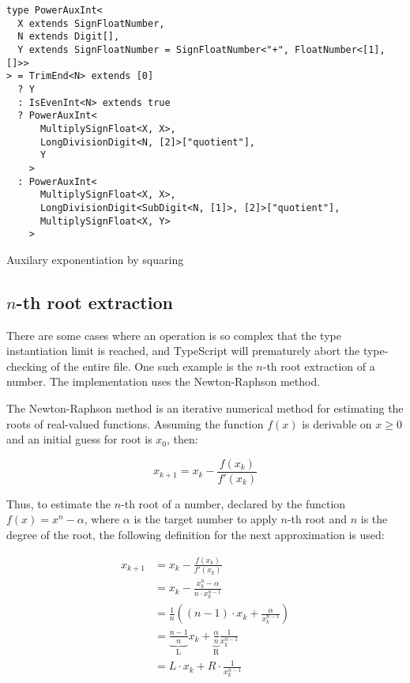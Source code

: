 \begin{listing}[ht]
  \begin{verbatim}
type PowerAuxInt<
  X extends SignFloatNumber,
  N extends Digit[],
  Y extends SignFloatNumber = SignFloatNumber<"+", FloatNumber<[1], []>>
> = TrimEnd<N> extends [0]
  ? Y
  : IsEvenInt<N> extends true
  ? PowerAuxInt<
      MultiplySignFloat<X, X>,
      LongDivisionDigit<N, [2]>["quotient"],
      Y
    >
  : PowerAuxInt<
      MultiplySignFloat<X, X>,
      LongDivisionDigit<SubDigit<N, [1]>, [2]>["quotient"],
      MultiplySignFloat<X, Y>
    >
\end{verbatim}
  \caption{Auxilary exponentiation by squaring}\label{lst:exponentiation-by-squaring-ts}
\end{listing}

\subsection{$n$-th root extraction}

There are some cases where an operation is so complex that the type instantiation limit is reached, and TypeScript will prematurely abort the type-checking of the entire file. One such example is the $n$-th root extraction of a number. The implementation uses the Newton-Raphson method.

The Newton-Raphson method \cite{gerlachAcceleratedConvergenceNewton1994} is an iterative numerical method for estimating the roots of real-valued functions. Assuming the function $f(x)$ is derivable on $x \ge 0$ and an initial guess for root is $x_0$, then:

\begin{equation}
  x_{k+1} = x_k - \frac{f(x_k)}{f'(x_k)}
\end{equation}

Thus, to estimate the $n$-th root of a number, declared by the function $f(x) = x^n - \alpha$, where $\alpha$ is the target number to apply $n$-th root and $n$ is the degree of the root, the following definition for the next approximation is used:

\begin{equation}
  \begin{split}
    x_{k+1} & = x_k - \frac{f(x_k)}{f'(x_k)}                                                                         \\
            & = x_k - \frac{x_k^n - \alpha}{n \cdot x_k^{n-1}}                                                       \\
            & = \frac{1}{n} \left( (n-1) \cdot x_k + \frac{\alpha}{x_k^{n-1}} \right)                                \\
            & = \underbrace{\frac{n-1}{n}}_\text{L} x_k + \underbrace{\frac{\alpha}{n}}_\text{R} \frac{1}{x_k^{n-1}} \\
            & = L \cdot x_k + R \cdot \frac{1}{x_k^{n-1}}                                                            \\
  \end{split}
\end{equation}

